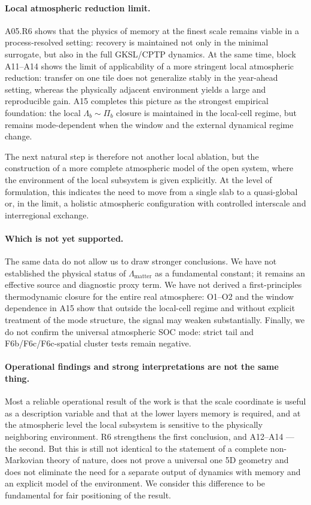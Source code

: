 \documentclass[11pt,a4paper]{article}
\theoremstyle{definition}
\theoremstyle{plain}
\theoremstyle{remark}
\begin{document}
\paragraph{Local atmospheric reduction limit.}
A05.R6 shows that the physics of memory at the finest scale remains viable in a process-resolved setting: recovery is maintained not only in the minimal surrogate, but also in the full GKSL/CPTP dynamics. At the same time, block A11--A14 shows the limit of applicability of a more stringent local atmospheric reduction: transfer on one tile does not generalize stably in the year-ahead setting, whereas the physically adjacent environment yields a large and reproducible gain. A15 completes this picture as the strongest empirical foundation: the local $\Lambda_b\sim\Pi_b$ closure is maintained in the local-cell regime, but remains mode-dependent when the window and the external dynamical regime change.

The next natural step is therefore not another local ablation, but the construction of a more complete atmospheric model of the open system, where the environment of the local subsystem is given explicitly. At the level of formulation, this indicates the need to move from a single slab to a quasi-global or, in the limit, a holistic atmospheric configuration with controlled interscale and interregional exchange.

\paragraph{Which is not yet supported.}
The same data do not allow us to draw stronger conclusions.
We have not established the physical status of $\Lambda_{\mathrm{matter}}$ as a fundamental constant;
it remains an effective source and diagnostic proxy term.
We have not derived a first-principles thermodynamic closure for the entire real atmosphere:
O1--O2 and the window dependence in A15 show that outside the local-cell regime and without explicit treatment of the mode structure,
the signal may weaken substantially.
Finally, we do not confirm the universal atmospheric SOC mode:
strict tail and F6b/F6c/F6c-spatial cluster tests remain negative.

\paragraph{Operational findings and strong interpretations are not the same thing.}
Most a reliable operational result of the work is that the scale coordinate is useful as a description variable
and that at the lower layers memory is required, and at the atmospheric level the local subsystem is sensitive to the physically neighboring environment.
R6 strengthens the first conclusion, and A12--A14 --- the second.
But this is still not identical to the statement of a complete non-Markovian theory of nature, does not prove a universal one 5D geometry
and does not eliminate the need for a separate output of dynamics with memory and an explicit model of the environment.
We consider this difference to be fundamental for fair positioning of the result.
\end{document}
